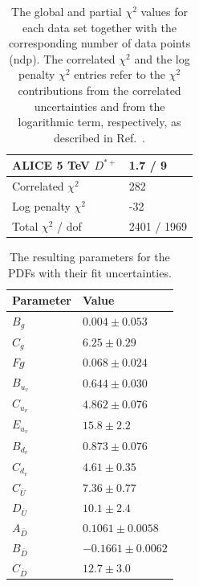 \documentclass[12pt]{article}
\begin{document}
\begin{table}
\begin{tabular}{ll}
    ALICE 5 TeV $D^{*+}$ & 1.7 / 9  \\ 
    \hline
    Correlated $\chi^2$  & 282  \\ 
    Log penalty $\chi^2$  &  -32  \\ 
    \hline
    Total $\chi^2$ / dof  & 2401 / 1969  \\ 
\end{tabular}
\caption{The global and partial $\chi^2$ values for each data set together with the corresponding number of data points (ndp). The correlated $\chi^2$ and the log penalty $\chi^2$ entries refer to the $\chi^2$ contributions from the correlated uncertainties and from the logarithmic term, respectively, as described in Ref.~\cite{Abramowicz:2015mha}.}
\label{tab:chi}
\end{table}

\begin{table}
    \renewcommand*{\arraystretch}{1.12}
    \centering
\begin{tabular}{ll}
    Parameter & Value \\
    \hline
    $B_g$ & $0.004 \pm 0.053$  \\
    $C_g$ & $6.25 \pm 0.29$  \\
    $Fg$ & $0.068 \pm 0.024$  \\
    $B_{u_v}$ & $0.644 \pm 0.030$  \\
    $C_{u_v}$ & $4.862 \pm 0.076$  \\
    $E_{u_v}$ & $15.8 \pm 2.2$  \\
    $B_{d_v}$ & $0.873 \pm 0.076$  \\
    $C_{d_v}$ & $4.61 \pm 0.35$  \\
    $C_{\overline{U}}$ & $7.36 \pm 0.77$  \\
    $D_{\overline{U}}$ & $10.1 \pm 2.4$  \\
    $A_{\overline{D}}$ & $0.1061 \pm 0.0058$  \\
    $B_{\overline{D}}$ & $-0.1661 \pm 0.0062$  \\
    $C_{\overline{D}}$ & $12.7 \pm 3.0$  \\
\end{tabular}
\caption{The resulting parameters for the PDFs with their fit uncertainties.}
\label{tab:pars}
\end{table}
\end{document}
